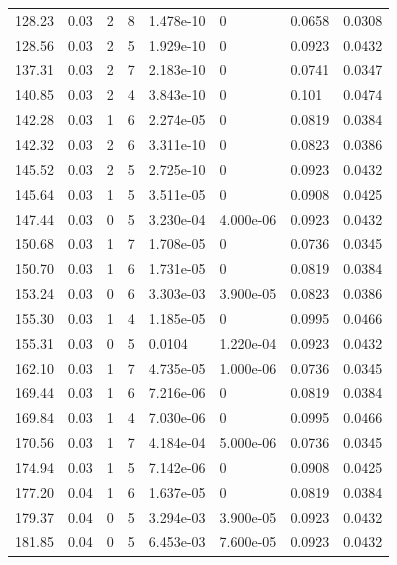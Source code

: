 \documentclass[preview]{standalone}
\begin{document}
{{{\begin{tabular}{L{1.2cm}C{1.2cm} C{0.3cm}C{0.5cm} C{1.4cm}C{1.4cm} C{1.4cm}C{1.4cm}}
  128.23  &  0.03  & 2     &  8 &  1.478e-10  & 0  & 0.0658 &  0.0308   \\ 
  128.56  &  0.03  & 2     &  5 &  1.929e-10  & 0  & 0.0923 &  0.0432   \\ 
  137.31  &  0.03  & 2     &  7 &  2.183e-10  & 0  & 0.0741 &  0.0347   \\ 
  140.85  &  0.03  & 2     &  4 &  3.843e-10  & 0  & 0.101 &  0.0474   \\ 
  142.28  &  0.03  & 1     &  6 &  2.274e-05  & 0  & 0.0819 &  0.0384   \\ 
  142.32  &  0.03  & 2     &  6 &  3.311e-10  & 0  & 0.0823 &  0.0386   \\ 
  145.52  &  0.03  & 2     &  5 &  2.725e-10  & 0  & 0.0923 &  0.0432   \\ 
  145.64  &  0.03  & 1     &  5 &  3.511e-05  & 0  & 0.0908 &  0.0425   \\ 
  147.44  &  0.03  & 0     &  5 &  3.230e-04  & 4.000e-06  & 0.0923 &  0.0432   \\ 
  150.68  &  0.03  & 1     &  7 &  1.708e-05  & 0  & 0.0736 &  0.0345   \\ 
  150.70  &  0.03  & 1     &  6 &  1.731e-05  & 0  & 0.0819 &  0.0384   \\ 
  153.24  &  0.03  & 0     &  6 &  3.303e-03  & 3.900e-05  & 0.0823 &  0.0386   \\ 
  155.30  &  0.03  & 1     &  4 &  1.185e-05  & 0  & 0.0995 &  0.0466   \\ 
  155.31  &  0.03  & 0     &  5 &  0.0104  & 1.220e-04  & 0.0923 &  0.0432   \\ 
  162.10  &  0.03  & 1     &  7 &  4.735e-05  & 1.000e-06  & 0.0736 &  0.0345   \\ 
  169.44  &  0.03  & 1     &  6 &  7.216e-06  & 0  & 0.0819 &  0.0384   \\ 
  169.84  &  0.03  & 1     &  4 &  7.030e-06  & 0  & 0.0995 &  0.0466   \\ 
  170.56  &  0.03  & 1     &  7 &  4.184e-04  & 5.000e-06  & 0.0736 &  0.0345   \\ 
  174.94  &  0.03  & 1     &  5 &  7.142e-06  & 0  & 0.0908 &  0.0425   \\ 
  177.20  &  0.04  & 1     &  6 &  1.637e-05  & 0  & 0.0819 &  0.0384   \\ 
  179.37  &  0.04  & 0     &  5 &  3.294e-03  & 3.900e-05  & 0.0923 &  0.0432   \\ 
  181.85  &  0.04  & 0     &  5 &  6.453e-03  & 7.600e-05  & 0.0923 &  0.0432   \\ 

\end{tabular}}}}
\end{document}
